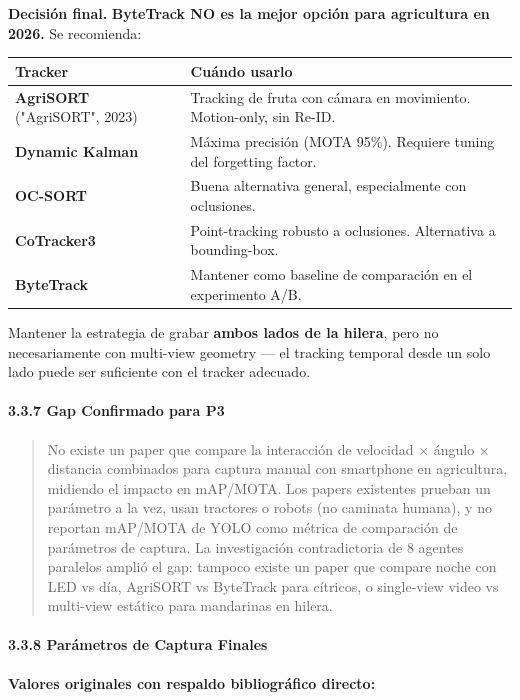 \textbf{Decisión final.} \textbf{ByteTrack NO es la mejor opción para agricultura en 2026.} Se recomienda:



\begin{tabular}{ll}
\hline
Tracker & Cuándo usarlo \\
\hline
\textbf{AgriSORT} ("AgriSORT", 2023) & Tracking de fruta con cámara en movimiento. Motion-only, sin Re-ID. \\
\textbf{Dynamic Kalman} & Máxima precisión (MOTA 95\%). Requiere tuning del forgetting factor. \\
\textbf{OC-SORT} & Buena alternativa general, especialmente con oclusiones. \\
\textbf{CoTracker3} & Point-tracking robusto a oclusiones. Alternativa a bounding-box. \\
\textbf{ByteTrack} & Mantener como baseline de comparación en el experimento A/B. \\
\hline
\end{tabular}


Mantener la estrategia de grabar \textbf{ambos lados de la hilera}, pero no necesariamente con multi-view geometry — el tracking temporal desde un solo lado puede ser suficiente con el tracker adecuado.


\paragraph{3.3.7 Gap Confirmado para P3}


\begin{quote}
No existe un paper que compare la interacción de velocidad × ángulo × distancia combinados para captura manual con smartphone en agricultura, midiendo el impacto en mAP/MOTA. Los papers existentes prueban un parámetro a la vez, usan tractores o robots (no caminata humana), y no reportan mAP/MOTA de YOLO como métrica de comparación de parámetros de captura. La investigación contradictoria de 8 agentes paralelos amplió el gap: tampoco existe un paper que compare noche con LED vs día, AgriSORT vs ByteTrack para cítricos, o single-view video vs multi-view estático para mandarinas en hilera.
\end{quote}


\paragraph{3.3.8 Parámetros de Captura Finales}


\textbf{Valores originales con respaldo bibliográfico directo:}



